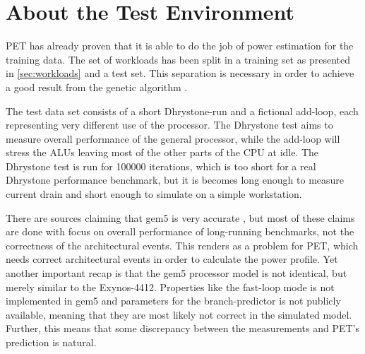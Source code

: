 \section{About the Test Environment}

PET has already proven that it is able to do the job of power estimation for the
training data. The set of workloads has been split in a training set as
presented in \autoref{sec:workloads} and a test set. This separation is
necessary in order to achieve a good result from the genetic algorithm
\cite{russellnorvig,rajer2003separation}.

The test data set consists of a short Dhrystone-run and a fictional add-loop,
each representing very different use of the processor. The Dhrystone test aims
to measure overall performance of the general processor, while the add-loop will
stress the ALUs leaving most of the other parts of the CPU at idle. The
Dhrystone test is run for 100000 iterations, which is too short for a real
Dhrystone performance benchmark, but it is becomes long enough to measure
current drain and short enough to simulate on a simple workstation.

There are sources claiming that gem5 is very accurate 
\cite{butko2012accuracy,pusdesrissources}, but most of these claims are done
with focus on overall performance of long-running benchmarks, not the correctness
of the architectural events. This renders as a problem for PET, which needs
correct architectural events in order to calculate the power profile. Yet
another important recap is that the gem5 processor model is not identical, but
merely similar to the Exynos-4412. Properties like the fast-loop mode is not implemented
in gem5 and parameters for the branch-predictor is not publicly available,
meaning that they are most likely not correct in the simulated model. Further,
this means that some discrepancy between the measurements and PET's prediction is
natural.
